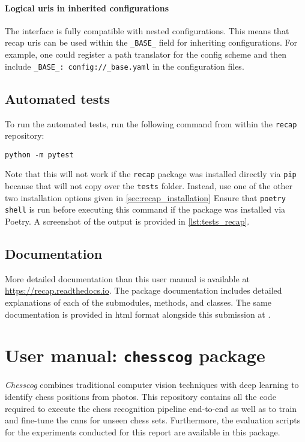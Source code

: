\documentclass[../../report.tex]{subfiles}
\begin{document}
\subsubsection{Logical \acsp{uri} in inherited configurations}
The  interface is fully compatible with nested configurations.
This means that recap \glspl{uri} can be used within the \texttt{_BASE_} field for inheriting configurations.
For example, one could register a path translator for the config scheme and then include \texttt{_BASE_: config://_base.yaml} in the configuration files.

\section{Automated tests}
\label{sec:recap_tests}
To run the automated tests, run the following command from within the \texttt{recap} repository:
\begin{verbatim}
python -m pytest
\end{verbatim}
Note that this will not work if the \texttt{recap} package was installed directly via \texttt{pip} because that will not copy over the \texttt{tests} folder.
Instead, use one of the other two installation options given in \cref{sec:recap_installation}
Ensure that \texttt{poetry shell} is run before executing this command if the package was installed via Poetry.
A screenshot of the output is provided in \cref{lst:tests_recap}.

\section{Documentation}
\label{sec:recap_documentation}
More detailed documentation than this user manual is available at \url{https://recap.readthedocs.io}.
The package documentation includes detailed explanations of each of the submodules, methods, and classes.
The same documentation is provided in \gls{html} format alongside this submission at .

\chapter{User manual: \texttt{chesscog} package}
\label{chap:user_man_chesscog}

\emph{Chesscog} combines traditional computer vision techniques with deep learning to identify chess positions from photos.
This repository contains all the code required to execute the chess recognition pipeline end-to-end as well as to train and fine-tune the \glspl{cnn} for unseen chess sets.
Furthermore, the evaluation scripts for the experiments conducted for this report are available in this package.
\end{document}
